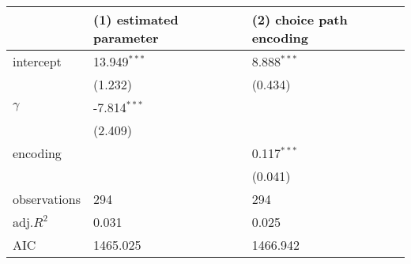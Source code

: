 \begin{tabular}{lll}
\hline
 & (1) estimated parameter & (2) choice path encoding \\
\hline
intercept & 13.949$^{***}$ & 8.888$^{***}$ \\
 & (1.232) & (0.434) \\
$\gamma$ & -7.814$^{***}$ &  \\
 & (2.409) &  \\
encoding &  & 0.117$^{***}$ \\
 &  & (0.041) \\
observations & 294 & 294 \\
adj.$R^2$ & 0.031 & 0.025 \\
AIC & 1465.025 & 1466.942 \\
\hline
\end{tabular}
